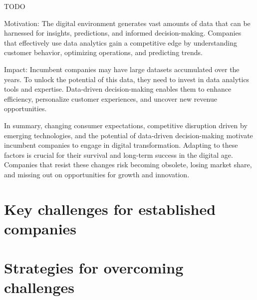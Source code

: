 \documentclass[a4]{scrartcl}
\begin{document}
	TODO

	Motivation: The digital environment generates vast amounts of data that can be harnessed for insights, predictions, and informed decision-making. Companies that effectively use data analytics gain a competitive edge by understanding customer behavior, optimizing operations, and predicting trends.
	
	
	Impact: Incumbent companies may have large datasets accumulated over the years. To unlock the potential of this data, they need to invest in data analytics tools and expertise. Data-driven decision-making enables them to enhance efficiency, personalize customer experiences, and uncover new revenue opportunities.
	
	
	
	In summary, changing consumer expectations, competitive disruption driven by emerging technologies, and the potential of data-driven decision-making motivate incumbent companies to engage in digital transformation. Adapting to these factors is crucial for their survival and long-term success in the digital age. Companies that resist these changes risk becoming obsolete, losing market share, and missing out on opportunities for growth and innovation.
	
	








\section{Key challenges for established companies} \label{sec:Sec2}












\section{Strategies for overcoming challenges} \label{sec:Sec3}












	
\newpage
{}
\begin{spacing}{0.9}
	\printbibliography
\end{spacing}


	
	
	
	
	
	
\end{document}
